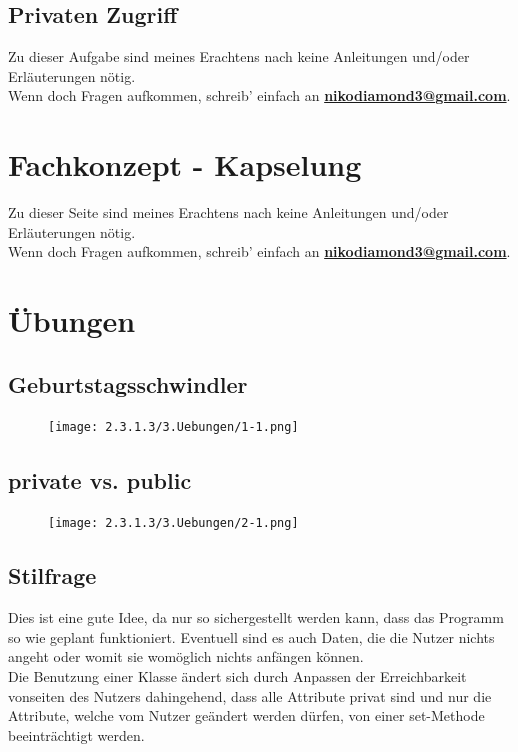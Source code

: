 \documentclass{scrartcl}   %
\begin{document}
\newpage

\subsection{Privaten Zugriff}

Zu dieser Aufgabe sind meines Erachtens nach keine Anleitungen und/oder Erläuterungen nötig.\\
Wenn doch Fragen aufkommen, schreib' einfach an \textbf{\href{mailto:nikodiamond3@gmail.com}{nikodiamond3@gmail.com}}.

\newpage

\section{Fachkonzept - Kapselung}

Zu dieser Seite sind meines Erachtens nach keine Anleitungen und/oder Erläuterungen nötig.\\
Wenn doch Fragen aufkommen, schreib' einfach an \textbf{\href{mailto:nikodiamond3@gmail.com}{nikodiamond3@gmail.com}}.

\newpage

\section{Übungen}

\subsection{Geburtstagsschwindler}

\begin{figure}[!h]
	\centering
	\texttt{[image: 2.3.1.3/3.Uebungen/1-1.png]}
\end{figure}

\subsection{private vs. public}

\begin{figure}[!h]
	\centering
	\texttt{[image: 2.3.1.3/3.Uebungen/2-1.png]}
\end{figure}

\newpage

\subsection{Stilfrage}

Dies ist eine gute Idee, da nur so sichergestellt werden kann, dass das Programm so wie geplant funktioniert. Eventuell sind es auch Daten, die die Nutzer nichts angeht oder womit sie womöglich nichts anfängen können.\\
Die Benutzung einer Klasse ändert sich durch Anpassen der Erreichbarkeit vonseiten des Nutzers dahingehend, dass alle Attribute privat sind und nur die Attribute, welche vom Nutzer geändert werden dürfen, von einer set-Methode beeinträchtigt werden.
\end{document}
